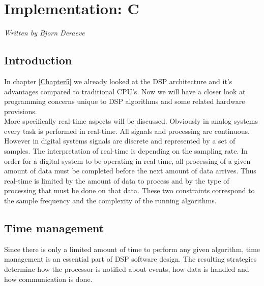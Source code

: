 \chapter{Implementation: C} 
\label{Chapter6}
\textsf{\textsl{Written by Bjorn Deraeve}}

\section{Introduction} \label{sec:a}
In chapter \ref{Chapter5} we already looked at the DSP architecture and it's advantages compared to traditional CPU's. Now we will have a closer look at programming concerns unique to DSP algorithms and some related hardware provisions. \\
More specifically real-time aspects will be discussed. Obviously in analog systems every task is performed in real-time. All signals and processing are continuous. However in digital systems signals are discrete and represented by a set of samples. The interpretation of real-time is depending on the sampling rate. In order for a digital system to be operating in real-time, all processing of a given amount of data must be completed before the next amount of data arrives. Thus real-time is limited by the amount of data to process and by the type of processing that must be done on that data. These two constraints correspond to the sample frequency and the complexity of the running algorithms.

\section{Time management}
Since there is only a limited amount of time to perform any given algorithm, time management is an essential part of DSP software design. The resulting strategies determine how the processor is notified about events, how data is handled and how communication is done.
